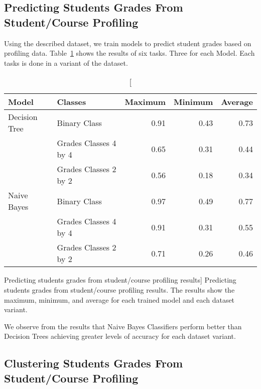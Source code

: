 \subsection{Predicting Students Grades From Student/Course Profiling}
\label{sec:exp_005}

Using the described dataset, we train models to predict student grades based on
profiling data. Table~\ref{tab:exp_005_res} shows the results of six tasks.
Three for each Model. Each tasks is done in a variant of the dataset.

\begin{table}[h!]
    \centering

    \begin{tabular}{| l | l | r | r | r |}
        \hline
        \textbf{Model} & \textbf{Classes} & \textbf{Maximum} & \textbf{Minimum} & \textbf{Average} \\ \hline
        Decision Tree & Binary Class          & 0.91 & 0.43 & 0.73 \\
                      & Grades Classes 4 by 4 & 0.65 & 0.31 & 0.44 \\
                      & Grades Classes 2 by 2 & 0.56 & 0.18 & 0.34 \\ \hline
        Naive Bayes   & Binary Class          & 0.97 & 0.49 & 0.77 \\
                      & Grades Classes 4 by 4 & 0.91 & 0.31 & 0.55 \\
                      & Grades Classes 2 by 2 & 0.71 & 0.26 & 0.46 \\ \hline
    \end{tabular}

    \caption
        [Predicting students grades from student/course profiling results]
        {Predicting students grades from student/course profiling results. The
        results show the maximum, minimum, and average for each trained model
        and each dataset variant.}

    \label{tab:exp_005_res}
\end{table}

We observe from the results that Naive Bayes Classifiers perform better than
Decision Trees achieving greater levels of accuracy for each dataset variant.

\subsection{Clustering Students Grades From Student/Course Profiling}
\label{sec:exp_006}

